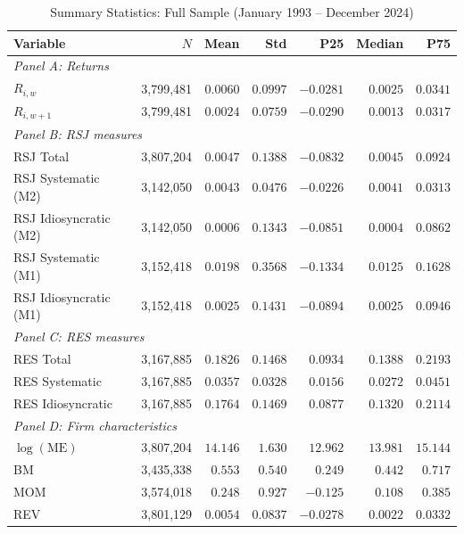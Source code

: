 \documentclass[11pt,a4paper]{article}
\begin{document}
\begin{table}[!htbp]
\centering
\caption{Summary Statistics: Full Sample (January 1993 -- December 2024)}
\label{tab:sumstats_full}
\small
\begin{threeparttable}
\begin{tabular}{l r r r r r r}
\toprule
Variable & $N$ & Mean & Std & P25 & Median & P75 \\
\midrule
\multicolumn{7}{l}{\textit{Panel A: Returns}} \\[2pt]
$R_{i,w}$
  & 3{,}799{,}481 & $0.0060$ & $0.0997$ & $-0.0281$ & $0.0025$ & $0.0341$ \\
$R_{i,w+1}$
  & 3{,}799{,}481 & $0.0024$ & $0.0759$ & $-0.0290$ & $0.0013$ & $0.0317$ \\[5pt]
\multicolumn{7}{l}{\textit{Panel B: RSJ measures}} \\[2pt]
RSJ Total
  & 3{,}807{,}204 & $0.0047$ & $0.1388$ & $-0.0832$ & $0.0045$ & $0.0924$ \\
RSJ Systematic (M2)
  & 3{,}142{,}050 & $0.0043$ & $0.0476$ & $-0.0226$ & $0.0041$ & $0.0313$ \\
RSJ Idiosyncratic (M2)
  & 3{,}142{,}050 & $0.0006$ & $0.1343$ & $-0.0851$ & $0.0004$ & $0.0862$ \\
RSJ Systematic (M1)
  & 3{,}152{,}418 & $0.0198$ & $0.3568$ & $-0.1334$ & $0.0125$ & $0.1628$ \\
RSJ Idiosyncratic (M1)
  & 3{,}152{,}418 & $0.0025$ & $0.1431$ & $-0.0894$ & $0.0025$ & $0.0946$ \\[5pt]
\multicolumn{7}{l}{\textit{Panel C: RES measures}} \\[2pt]
RES Total
  & 3{,}167{,}885 & $0.1826$ & $0.1468$ & $0.0934$ & $0.1388$ & $0.2193$ \\
RES Systematic
  & 3{,}167{,}885 & $0.0357$ & $0.0328$ & $0.0156$ & $0.0272$ & $0.0451$ \\
RES Idiosyncratic
  & 3{,}167{,}885 & $0.1764$ & $0.1469$ & $0.0877$ & $0.1320$ & $0.2114$ \\[5pt]
\multicolumn{7}{l}{\textit{Panel D: Firm characteristics}} \\[2pt]
$\log(\text{ME})$
  & 3{,}807{,}204 & $14.146$ & $1.630$  & $12.962$ & $13.981$ & $15.144$ \\
BM
  & 3{,}435{,}338 & $0.553$  & $0.540$  & $0.249$  & $0.442$  & $0.717$  \\
MOM
  & 3{,}574{,}018 & $0.248$  & $0.927$  & $-0.125$ & $0.108$  & $0.385$  \\
REV
  & 3{,}801{,}129 & $0.0054$ & $0.0837$ & $-0.0278$& $0.0022$ & $0.0332$ \\

\end{tabular}
\end{threeparttable}
\end{table}
\end{document}
